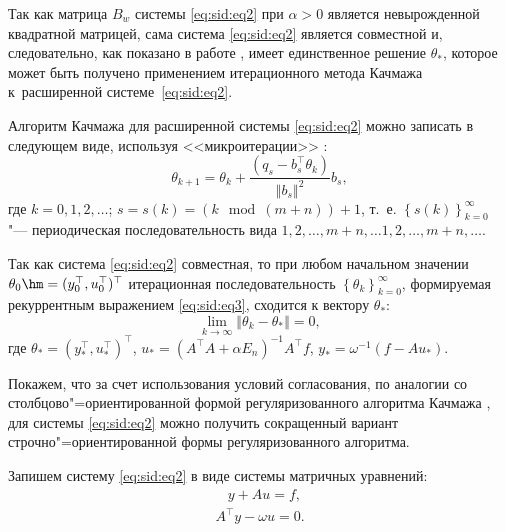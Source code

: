 Так как матрица $B_w$ системы \eqref{eq:sid:eq2} при $\alpha>0$ является невырожденной квадратной матрицей, сама система \eqref{eq:sid:eq2} является совместной и, следовательно,  как показано в работе \cite{zhdanovsid:bib:Tanabe}, имеет единственное решение $\theta_*$, которое может быть получено применением итерационного метода Качмажа к~расширенной системе~\eqref{eq:sid:eq2}.

Алгоритм Качмажа для расширенной системы \eqref{eq:sid:eq2} можно записать в следующем виде, используя <<микроитерации>> \cite{zhdanovsid:bib:Ilin}:
\begin{equation}
\label{eq:sid:eq3}
\theta_{k+1} = \theta_k+\frac{(q_s-b^{\top}_s\theta_k )}{\left \Vert b_s \right \Vert^2}b_s,
\end{equation}
где $k = 0, 1, 2, \dots$; 
$s = s(k) = \left(k \mod (m+n)\right)+1$, т.~е. $\left\lbrace s\left(k\right)\right\rbrace^{\infty}_{k=0}$ "--- периодическая последовательность вида $1,  2,  \dots , m+n, \dots 1, 2, \dots , m+n, \dots$.

Так как система \eqref{eq:sid:eq2} совместная, то при любом начальном значении $\theta_0\hm =(y^\top_0, u^\top_0 )^\top$ итерационная последовательность $\left\lbrace \theta_k\right\rbrace_{k=0}^{\infty}$, формируемая рекуррентным выражением \eqref{eq:sid:eq3}, сходится к вектору $\theta_{*}$:
\begin{equation*}
\displaystyle \lim_{k\to\infty} \left \Vert \theta_k-\theta_{*} \right \Vert=0,
\end{equation*}
где $\theta_*= (y^\top_*, u^\top_*)^\top$, $u_*= (A^\top  A+\alpha E_n )^{-1}A^\top f$, 
$y_*=\omega^{-1} (f-Au_* )$.

Покажем, что за счет использования условий согласования, по аналогии со столбцово"=ориентированной формой регуляризованного алгоритма Качмажа \cite{zhdanovsid:bib:Ivanov}, для системы \eqref{eq:sid:eq2} можно получить сокращенный вариант строчно"=ориентированной формы регуляризованного алгоритма.

\smallskip

Запишем систему \eqref{eq:sid:eq2} в виде системы матричных уравнений:
\begin{gather}
\label{eq:sid:eqs41}
~~~~y +A u = f,\\
\label{eq:sid:eqs42}
A^\top  y - \omega u  = 0.
\end{gather}


